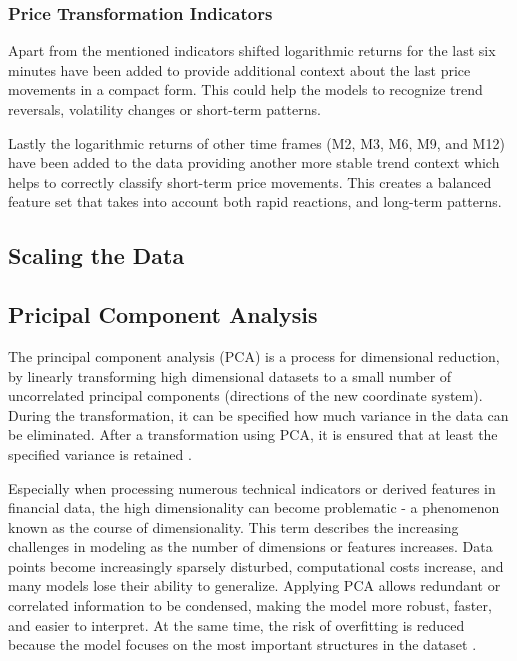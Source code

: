 \subsubsection{Price Transformation Indicators}

Apart from the mentioned indicators shifted logarithmic returns for the last six minutes have been added to provide additional context about the last price movements in a compact form.
This could help the models to recognize trend reversals, volatility changes or short-term patterns.

Lastly the logarithmic returns of other time frames (M2, M3, M6, M9, and M12) have been added to the data providing another more stable trend context which helps to correctly classify short-term price movements.
This creates a balanced feature set that takes into account both rapid reactions, and long-term patterns.

\subsection{Scaling the Data}

\subsection{Pricipal Component Analysis}

The principal component analysis (PCA) is a process for dimensional reduction, by linearly transforming high dimensional datasets to a small number of uncorrelated principal components  (directions of the new coordinate system).
During the transformation, it can be specified how much variance in the data can be eliminated.
After a transformation using PCA, it is ensured that at least the specified variance is retained \cite{wikipedia-pca}.

Especially when processing numerous technical indicators or derived features in financial data, the high dimensionality can become problematic - a phenomenon known as the course of dimensionality.
This term describes the increasing challenges in modeling as the number of dimensions or features increases.
Data points become increasingly sparsely disturbed, computational costs increase, and many models lose their ability to generalize.
Applying PCA allows redundant or correlated information to be condensed, making the model more robust, faster, and easier to interpret.
At the same time, the risk of overfitting is reduced because the model focuses on the most important structures in the dataset \cite{wikipedia-curse-od-dimensionality}.

